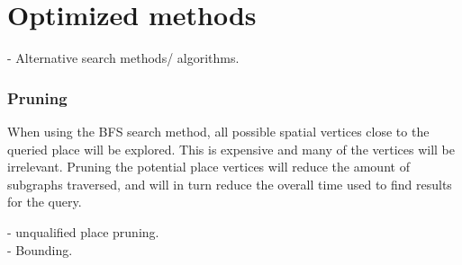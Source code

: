 
\chapter{Optimized methods}

- Alternative search methods/ algorithms.\\

\subsection{Pruning}
When using the BFS search method, all possible spatial vertices close to the queried place will be explored. This is expensive and many of the vertices will be irrelevant. Pruning the potential place vertices will reduce the amount of subgraphs traversed, and will in turn reduce the overall time used to find results for the query.

- unqualified place pruning.\\

- Bounding.\\

\clearpage